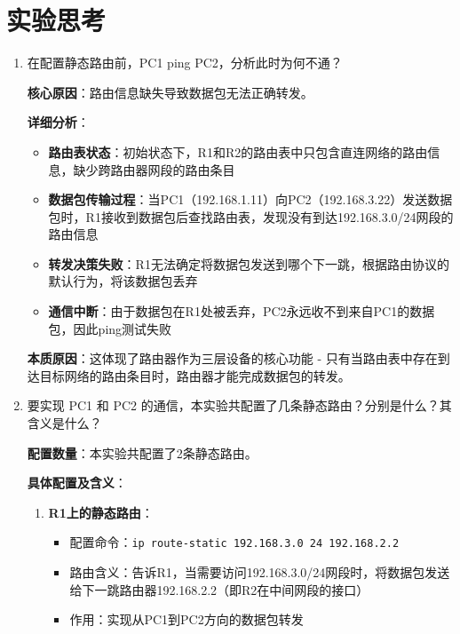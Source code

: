 \documentclass[a4paper]{article}
\begin{document}
\section{实验思考}
\begin{enumerate}
    \item 在配置静态路由前，PC1 ping PC2，分析此时为何不通？

    \begin{myquote}[colback=blue!5!white,colframe=blue!75!black,title=回答]
    \textbf{核心原因}：路由信息缺失导致数据包无法正确转发。
    
    \textbf{详细分析}：
    \begin{itemize}
        \item \textbf{路由表状态}：初始状态下，R1和R2的路由表中只包含直连网络的路由信息，缺少跨路由器网段的路由条目
        \item \textbf{数据包传输过程}：当PC1（192.168.1.11）向PC2（192.168.3.22）发送数据包时，R1接收到数据包后查找路由表，发现没有到达192.168.3.0/24网段的路由信息
        \item \textbf{转发决策失败}：R1无法确定将数据包发送到哪个下一跳，根据路由协议的默认行为，将该数据包丢弃
        \item \textbf{通信中断}：由于数据包在R1处被丢弃，PC2永远收不到来自PC1的数据包，因此ping测试失败
    \end{itemize}
    
    \textbf{本质原因}：这体现了路由器作为三层设备的核心功能 - 只有当路由表中存在到达目标网络的路由条目时，路由器才能完成数据包的转发。
    \end{myquote}

    \item 要实现 PC1 和 PC2 的通信，本实验共配置了几条静态路由？分别是什么？其含义是什么？

    \begin{myquote}[colback=green!5!white,colframe=green!75!black,title=回答]
    \textbf{配置数量}：本实验共配置了2条静态路由。
    
    \textbf{具体配置及含义}：
    \begin{enumerate}
        \item \textbf{R1上的静态路由}：
        \begin{itemize}
            \item 配置命令：\texttt{ip route-static 192.168.3.0 24 192.168.2.2}
            \item 路由含义：告诉R1，当需要访问192.168.3.0/24网段时，将数据包发送给下一跳路由器192.168.2.2（即R2在中间网段的接口）
            \item 作用：实现从PC1到PC2方向的数据包转发
        \end{itemize}
        

\end{enumerate}
\end{myquote}
\end{enumerate}
\end{document}
